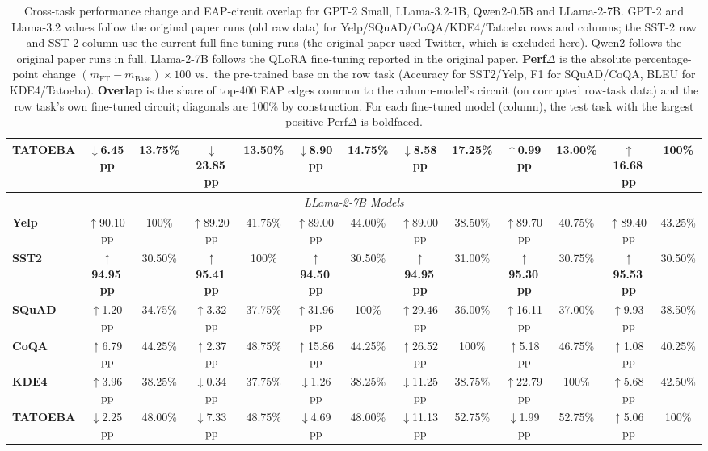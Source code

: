 \begin{table}[htb]
{\begin{tabular}{|l|cc|cc|cc|cc|cc|cc|}
\textbf{TATOEBA} & $\downarrow$6.45\,pp & 13.75\% & $\downarrow$23.85\,pp & 13.50\% & $\downarrow$8.90\,pp & 14.75\% & $\downarrow$8.58\,pp & 17.25\% & $\uparrow$0.99\,pp & 13.00\% & \textbf{$\uparrow$16.68\,pp} & 100\% \\
\hline
\hline
\multicolumn{13}{|c|}{\textit{LLama-2-7B Models}} \\
\hline
\textbf{Yelp} & $\uparrow$90.10\,pp & 100\% & $\uparrow$89.20\,pp & 41.75\% & $\uparrow$89.00\,pp & 44.00\% & $\uparrow$89.00\,pp & 38.50\% & $\uparrow$89.70\,pp & 40.75\% & $\uparrow$89.40\,pp & 43.25\% \\
\textbf{SST2} & \textbf{$\uparrow$94.95\,pp} & 30.50\% & \textbf{$\uparrow$95.41\,pp} & 100\% & \textbf{$\uparrow$94.50\,pp} & 30.50\% & \textbf{$\uparrow$94.95\,pp} & 31.00\% & \textbf{$\uparrow$95.30\,pp} & 30.75\% & \textbf{$\uparrow$95.53\,pp} & 30.50\% \\
\textbf{SQuAD} & $\uparrow$1.20\,pp & 34.75\% & $\uparrow$3.32\,pp & 37.75\% & $\uparrow$31.96\,pp & 100\% & $\uparrow$29.46\,pp & 36.00\% & $\uparrow$16.11\,pp & 37.00\% & $\uparrow$9.93\,pp & 38.50\% \\
\textbf{CoQA} & $\uparrow$6.79\,pp & 44.25\% & $\uparrow$2.37\,pp & 48.75\% & $\uparrow$15.86\,pp & 44.25\% & $\uparrow$26.52\,pp & 100\% & $\uparrow$5.18\,pp & 46.75\% & $\uparrow$1.08\,pp & 40.25\% \\
\textbf{KDE4} & $\uparrow$3.96\,pp & 38.25\% & $\downarrow$0.34\,pp & 37.75\% & $\downarrow$1.26\,pp & 38.25\% & $\downarrow$11.25\,pp & 38.75\% & $\uparrow$22.79\,pp & 100\% & $\uparrow$5.68\,pp & 42.50\% \\
\textbf{TATOEBA} & $\downarrow$2.25\,pp & 48.00\% & $\downarrow$7.33\,pp & 48.75\% & $\downarrow$4.69\,pp & 48.00\% & $\downarrow$11.13\,pp & 52.75\% & $\downarrow$1.99\,pp & 52.75\% & $\uparrow$5.06\,pp & 100\% \\
\hline
\hline
\end{tabular}}
\caption{Cross-task performance change and EAP-circuit overlap for GPT-2 Small, LLama-3.2-1B, Qwen2-0.5B and LLama-2-7B. GPT-2 and Llama-3.2 values follow the original paper runs (old raw data) for Yelp/SQuAD/CoQA/KDE4/Tatoeba rows and columns; the SST-2 row and SST-2 column use the current full fine-tuning runs (the original paper used Twitter, which is excluded here). Qwen2 follows the original paper runs in full. Llama-2-7B follows the QLoRA fine-tuning reported in the original paper. \textbf{Perf$\Delta$} is the absolute percentage-point change $(m_{\mathrm{FT}}-m_{\mathrm{Base}})\times 100$ vs.\ the pre-trained base on the row task (Accuracy for SST2/Yelp, F1 for SQuAD/CoQA, BLEU for KDE4/Tatoeba). \textbf{Overlap} is the share of top-400 EAP edges common to the column-model's circuit (on corrupted row-task data) and the row task's own fine-tuned circuit; diagonals are 100\% by construction. For each fine-tuned model (column), the test task with the largest positive Perf$\Delta$ is boldfaced.}
\label{tab:performance_overlap}
\end{table}
